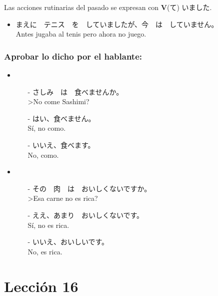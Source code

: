 \documentclass[a4paper,12pt,oneside]{report}
\def\bv{\textbf{V}} %
\begin{document}
\begin{CJK*}{UTF8}{min}
        Las acciones rutinarias del pasado se expresan con \bv(て) いました.

        \begin{itemize}
          \item まえに　テニス　を　していましたが、今　は　していません。\\
                Antes jugaba al tenis pero ahora no juego.
        \end{itemize}

      \subsubsection{Aprobar lo dicho por el hablante:}

        \begin{itemize}
          \item
            \begin{itemize}
              \item[-] さしみ　は　食べませんか。\\
                       >No come Sashimi?
              \item[-] はい、食べません。\\
                       S\'i, no como.
              \item[-] いいえ、食べます。\\
                       No, como.
            \end{itemize}
          \item
            \begin{itemize}
              \item[-] その　肉　は　おいしくないですか。\\
                       >Esa carne no es rica?
              \item[-] ええ、あまり　おいしくないです。\\
                       S\'i, no es rica.
              \item[-] いいえ、おいしいです。\\
                       No, es rica.
            \end{itemize}
        \end{itemize}


    \section{Lección 16}


\end{CJK*}
\end{document}
